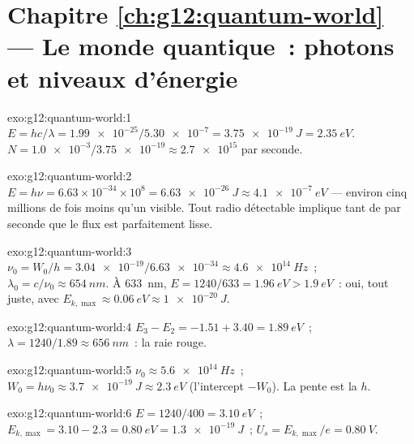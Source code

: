 \section*{Chapitre \ref{ch:g12:quantum-world} --- Le monde quantique~: photons et niveaux d'énergie}

\begin{solution}{exo:g12:quantum-world:1}
$E = hc/\lambda = \num{1.99e-25}/\num{5.30e-7} = \qty{3.75e-19}{J} =
\qty{2.35}{eV}$. $N = \num{1.0e-3}/\num{3.75e-19} \approx \num{2.7e15}$
 par seconde.
\end{solution}

\begin{solution}{exo:g12:quantum-world:2}
$E = h\nu = 6.63\times10^{-34} \times 10^{8} = \qty{6.63e-26}{J}
\approx \qty{4.1e-7}{eV}$ --- environ cinq millions de fois moins
qu'un  visible. Tout
 radio détectable implique tant de
 par seconde que le flux est parfaitement
lisse.
\end{solution}

\begin{solution}{exo:g12:quantum-world:3}
$\nu_0 = W_0/h = \num{3.04e-19}/\num{6.63e-34} \approx
\qty{4.6e14}{Hz}$~; $\lambda_0 = c/\nu_0 \approx \qty{654}{nm}$. À
\qty{633}{nm}, $E = 1240/633 = \qty{1.96}{eV} > \qty{1.9}{eV}$~: oui,
tout juste, avec $E_{k,\max} \approx \qty{0.06}{eV} \approx
\qty{1e-20}{J}$.
\end{solution}

\begin{solution}{exo:g12:quantum-world:4}
$E_3 - E_2 = -1.51 + 3.40 = \qty{1.89}{eV}$~;
$\lambda = 1240/1.89 \approx \qty{656}{nm}$~: la raie rouge.
\end{solution}

\begin{solution}{exo:g12:quantum-world:5}
$\nu_0 \approx \qty{5.6e14}{Hz}$~; $W_0 = h\nu_0 \approx
\qty{3.7e-19}{J} \approx \qty{2.3}{eV}$ (l'intercept $-W_0$). La
pente est la  $h$.
\end{solution}

\begin{solution}{exo:g12:quantum-world:6}
$E = 1240/400 = \qty{3.10}{eV}$~; $E_{k,\max} = 3.10 - 2.3 =
\qty{0.80}{eV} = \qty{1.3e-19}{J}$~; $U_s = E_{k,\max}/e =
\qty{0.80}{V}$.
\end{solution}

